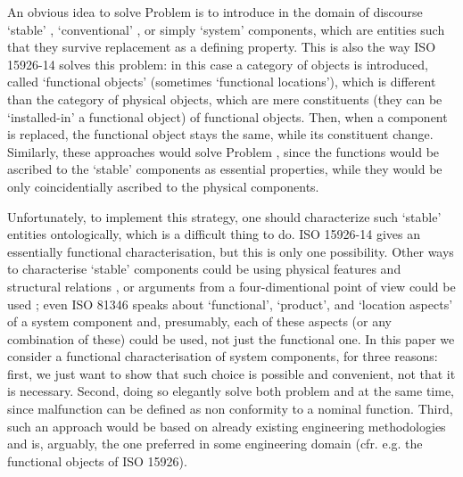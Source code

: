 \documentclass[
]{ceurart}
\begin{document}
An obvious idea to solve Problem  is to introduce in the domain of discourse `stable' \cite{compagnoComparingOntologicalAlternatives2021}, `conventional' \cite{guarinoArtefactualSystemsMissing2014}, or simply `system' \cite{westDevelopingHighQuality2011} components, which are entities such that they survive replacement as a defining property.   
This is also the way ISO 15926-14 \cite{kluwerISO159261420202020} solves this problem: in this case a category of objects is introduced, called `functional objects' (sometimes `functional locations'), which is different than the category of physical objects, which are mere constituents (they can be `installed-in' a functional object) of functional objects. Then, when a component is replaced, the functional object stays the same, while its constituent change. Similarly, these approaches would solve Problem , since the functions would be ascribed to the `stable' components as essential properties, while they would be only coincidentially ascribed to the physical components. 

Unfortunately, to implement this strategy, one should characterize such `stable' entities ontologically, which is a difficult thing to do.
ISO 15926-14 gives an essentially functional characterisation, but this is only one possibility. Other ways to characterise `stable' components could be using physical features and structural relations \cite{compagnoComparingOntologicalAlternatives2021}, or arguments from a four-dimentional point of view could be used \cite{westDevelopingHighQuality2011}; even ISO 81346 \cite{ISOIEC8134612009} speaks about `functional', `product', and `location aspects' of a system component and, presumably, each of these aspects (or any combination of these) could be used, not just the functional one.
In this paper we consider a functional characterisation of system components, for three reasons: first, we just want to show that such choice is possible and convenient, not that it is necessary. Second, doing so elegantly solve both problem  and  at the same time, since malfunction can be defined as non conformity to a nominal function. Third, such an approach would be based on already existing engineering methodologies and is, arguably, the one preferred in some engineering domain (cfr. e.g. the functional objects of ISO 15926).
\end{document}
